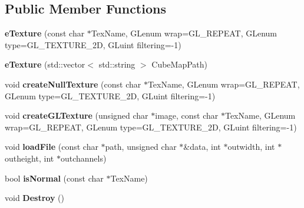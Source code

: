 \subsection*{Public Member Functions}
\begin{DoxyCompactItemize}
\item 
{\bfseries e\+Texture} (const char $\ast$Tex\+Name, G\+Lenum wrap=G\+L\+\_\+\+R\+E\+P\+E\+AT, G\+Lenum type=G\+L\+\_\+\+T\+E\+X\+T\+U\+R\+E\+\_\+2D, G\+Luint filtering=-\/1)\hypertarget{classe_texture_a9ec24a2a3a66ef1a3b01f3a771678cd0}{}\label{classe_texture_a9ec24a2a3a66ef1a3b01f3a771678cd0}

\item 
{\bfseries e\+Texture} (std\+::vector$<$ std\+::string $>$ Cube\+Map\+Path)\hypertarget{classe_texture_aeafb4e7b82a31dc25568b682afbbdbfd}{}\label{classe_texture_aeafb4e7b82a31dc25568b682afbbdbfd}

\item 
void {\bfseries create\+Null\+Texture} (const char $\ast$Tex\+Name, G\+Lenum wrap=G\+L\+\_\+\+R\+E\+P\+E\+AT, G\+Lenum type=G\+L\+\_\+\+T\+E\+X\+T\+U\+R\+E\+\_\+2D, G\+Luint filtering=-\/1)\hypertarget{classe_texture_a83ddd5b62c54b797fc280525df59cd3b}{}\label{classe_texture_a83ddd5b62c54b797fc280525df59cd3b}

\item 
void {\bfseries create\+G\+L\+Texture} (unsigned char $\ast$image, const char $\ast$Tex\+Name, G\+Lenum wrap=G\+L\+\_\+\+R\+E\+P\+E\+AT, G\+Lenum type=G\+L\+\_\+\+T\+E\+X\+T\+U\+R\+E\+\_\+2D, G\+Luint filtering=-\/1)\hypertarget{classe_texture_a7b3ac2468c3742bcaf750321b7d3da08}{}\label{classe_texture_a7b3ac2468c3742bcaf750321b7d3da08}

\item 
void {\bfseries load\+File} (const char $\ast$path, unsigned char $\ast$\&data, int $\ast$outwidth, int $\ast$outheight, int $\ast$outchannels)\hypertarget{classe_texture_a58994ab16a3e5a5a799347b452639cfe}{}\label{classe_texture_a58994ab16a3e5a5a799347b452639cfe}

\item 
bool {\bfseries is\+Normal} (const char $\ast$Tex\+Name)\hypertarget{classe_texture_afeb634ec4c3c0b50f47419586c9865d3}{}\label{classe_texture_afeb634ec4c3c0b50f47419586c9865d3}

\item 
void {\bfseries Destroy} ()\hypertarget{classe_texture_a6e35d16487176c7374bcb4278e63d49d}{}\label{classe_texture_a6e35d16487176c7374bcb4278e63d49d}


\end{DoxyCompactItemize}

